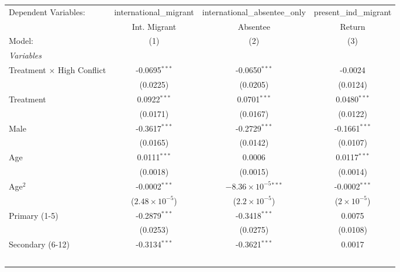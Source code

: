 
\begingroup
\centering
\begin{tabular}{lccc}
   \tabularnewline \midrule \midrule
   Dependent Variables:              & international\_migrant  & international\_absentee\_only   & present\_ind\_migrant\\    
                                     & Int. Migrant            & Absentee                        & Return \\   
   Model:                            & (1)                     & (2)                             & (3)\\  
   \midrule
   \emph{Variables}\\
   Treatment $\times$ High Conflict  & -0.0695$^{***}$         & -0.0650$^{***}$                 & -0.0024\\   
                                     & (0.0225)                & (0.0205)                        & (0.0124)\\   
   Treatment                         & 0.0922$^{***}$          & 0.0701$^{***}$                  & 0.0480$^{***}$\\   
                                     & (0.0171)                & (0.0167)                        & (0.0122)\\   
   Male                              & -0.3617$^{***}$         & -0.2729$^{***}$                 & -0.1661$^{***}$\\   
                                     & (0.0165)                & (0.0142)                        & (0.0107)\\   
   Age                               & 0.0111$^{***}$          & 0.0006                          & 0.0117$^{***}$\\   
                                     & (0.0018)                & (0.0015)                        & (0.0014)\\   
   Age$^2$                           & -0.0002$^{***}$         & $-8.36\times 10^{-5}$$^{***}$   & -0.0002$^{***}$\\   
                                     & ($2.48\times 10^{-5}$)  & ($2.2\times 10^{-5}$)           & ($2\times 10^{-5}$)\\    
   Primary (1-5)                     & -0.2879$^{***}$         & -0.3418$^{***}$                 & 0.0075\\   
                                     & (0.0253)                & (0.0275)                        & (0.0108)\\   
   Secondary (6-12)                  & -0.3134$^{***}$         & -0.3621$^{***}$                 & 0.0017\\   
$$
\end{tabular}
